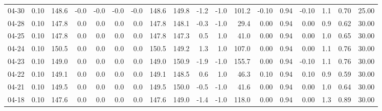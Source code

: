 \begin{threeparttable}
{\begin{tabular}{lrrrrrrrrrrrrrrrrr}
  04-30 &     0.10 & 148.6 &              -0.0 &              -0.0 &               -0.0 &               -0.0 & 148.6 & 149.8 &       -1.2 &                     -1.0 &               101.2 &      -0.10 &      0.94 &          -0.10 &              1.1 &            0.70 &                  25.00 \\
  04-28 &     0.10 & 147.8 &               0.0 &               0.0 &                0.0 &                0.0 & 147.8 & 148.1 &       -0.3 &                     -1.0 &                29.4 &       0.00 &      0.94 &           0.00 &              0.9 &            0.62 &                  30.00 \\
  04-25 &     0.10 & 147.8 &               0.0 &               0.0 &                0.0 &                0.0 & 147.8 & 147.3 &        0.5 &                      1.0 &                41.0 &       0.00 &      0.94 &           0.00 &              1.0 &            0.65 &                  30.00 \\
  04-24 &     0.10 & 150.5 &               0.0 &               0.0 &                0.0 &                0.0 & 150.5 & 149.2 &        1.3 &                      1.0 &               107.0 &       0.00 &      0.94 &           0.00 &              1.1 &            0.76 &                  30.00 \\
  04-23 &     0.10 & 149.0 &               0.0 &               0.0 &                0.0 &                0.0 & 149.0 & 150.9 &       -1.9 &                     -1.0 &               155.7 &       0.00 &      0.94 &          -0.10 &              1.1 &            0.76 &                  30.00 \\
  04-22 &     0.10 & 149.1 &               0.0 &               0.0 &                0.0 &                0.0 & 149.1 & 148.5 &        0.6 &                      1.0 &                46.3 &       0.10 &      0.94 &           0.10 &              0.9 &            0.59 &                  30.00 \\
  04-21 &     0.10 & 149.5 &               0.0 &               0.0 &                0.0 &                0.0 & 149.5 & 150.0 &       -0.5 &                     -1.0 &                41.6 &       0.00 &      0.94 &           0.00 &              1.0 &            0.64 &                  30.00 \\
  04-18 &     0.10 & 147.6 &               0.0 &               0.0 &                0.0 &                0.0 & 147.6 & 149.0 &       -1.4 &                     -1.0 &               118.0 &       0.00 &      0.94 &           0.00 &              1.3 &            0.89 &                  30.00 \\

\end{tabular}}
\end{threeparttable}
